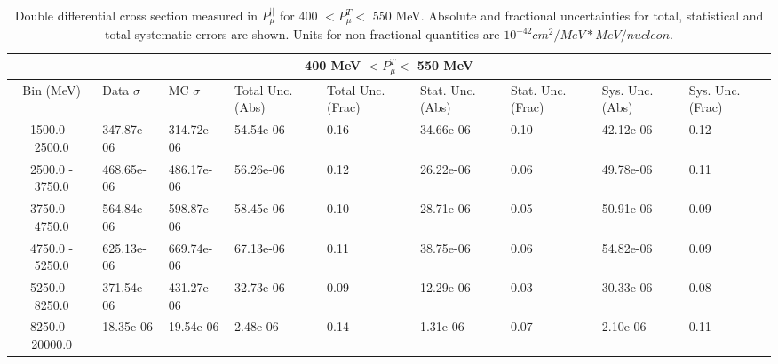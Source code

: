 \begin{table}[!htb]
    \centering
    \tiny
    \begin{tabular}{|c|p{0.5in}|p{0.5in}|p{0.5in}|p{0.5in}|p{0.5in}|p{0.5in}|p{0.5in}|p{0.5in}|}

        \hline
        \multicolumn{9}{c}{400 MeV $ < P^T_\mu < $ 550 MeV}\\
        \hline
        Bin (MeV)& Data $\sigma$ & MC $\sigma$ & Total Unc. (Abs) & Total Unc. (Frac)  & Stat. Unc. (Abs) & Stat. Unc. (Frac) & Sys. Unc. (Abs) & Sys. Unc. (Frac)\\ \hline
1500.0 - 2500.0 & 347.87e-06 & 314.72e-06 & 54.54e-06 & 0.16 & 34.66e-06 & 0.10 & 42.12e-06 & 0.12\\ \hline
2500.0 - 3750.0 & 468.65e-06 & 486.17e-06 & 56.26e-06 & 0.12 & 26.22e-06 & 0.06 & 49.78e-06 & 0.11\\ \hline
3750.0 - 4750.0 & 564.84e-06 & 598.87e-06 & 58.45e-06 & 0.10 & 28.71e-06 & 0.05 & 50.91e-06 & 0.09\\ \hline
4750.0 - 5250.0 & 625.13e-06 & 669.74e-06 & 67.13e-06 & 0.11 & 38.75e-06 & 0.06 & 54.82e-06 & 0.09\\ \hline
5250.0 - 8250.0 & 371.54e-06 & 431.27e-06 & 32.73e-06 & 0.09 & 12.29e-06 & 0.03 & 30.33e-06 & 0.08\\ \hline
8250.0 - 20000.0 & 18.35e-06 & 19.54e-06 & 2.48e-06 & 0.14 & 1.31e-06 & 0.07 & 2.10e-06 & 0.11\\ \hline


    \end{tabular}
    \caption{Double differential cross section measured in $P^{||}_\mu$ for 400 $ < P^T_\mu < $ 550 MeV. Absolute and fractional uncertainties for total, statistical and total systematic errors are shown. Units for non-fractional quantities are $10^{-42}cm^2/MeV*MeV/nucleon$.}
    \label{tab:ApdxA:XSecTable2Dpzmuptmu4}
\end{table}


